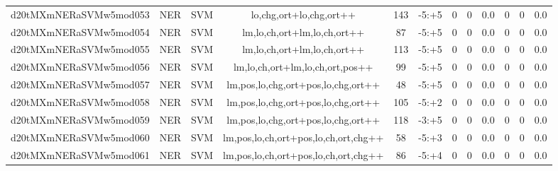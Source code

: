 \documentclass[a4paper]{article}
\begin{document}
\begin{landscape}
\begin{center}
\begin{tabular}{ |c|c|c|c|c|c|c|c|c|c|c|c|}
 
 	
 	\small{ d20tMXmNERaSVMw5mod053 } & \small{ NER} & \small{  SVM }  & lo,chg,ort+lo,chg,ort++  &  143 &  \small{  -5:+5 }  &  0 & 0 & 0.0  &  0 & 0 & 0.0 \\
 	

 
 	
 	\small{ d20tMXmNERaSVMw5mod054 } & \small{ NER} & \small{  SVM }  & lm,lo,ch,ort+lm,lo,ch,ort++  &  87 &  \small{  -5:+5 }  &  0 & 0 & 0.0  &  0 & 0 & 0.0 \\
 	

 
 	
 	\small{ d20tMXmNERaSVMw5mod055 } & \small{ NER} & \small{  SVM }  & lm,lo,ch,ort+lm,lo,ch,ort++  &  113 &  \small{  -5:+5 }  &  0 & 0 & 0.0  &  0 & 0 & 0.0 \\
 	

 
 	
 	\small{ d20tMXmNERaSVMw5mod056 } & \small{ NER} & \small{  SVM }  & lm,lo,ch,ort+lm,lo,ch,ort,pos++  &  99 &  \small{  -5:+5 }  &  0 & 0 & 0.0  &  0 & 0 & 0.0 \\
 	

 
 	
 	\small{ d20tMXmNERaSVMw5mod057 } & \small{ NER} & \small{  SVM }  & lm,pos,lo,chg,ort+pos,lo,chg,ort++  &  48 &  \small{  -5:+5 }  &  0 & 0 & 0.0  &  0 & 0 & 0.0 \\
 	

 
 	
 	\small{ d20tMXmNERaSVMw5mod058 } & \small{ NER} & \small{  SVM }  & lm,pos,lo,chg,ort+pos,lo,chg,ort++  &  105 &  \small{  -5:+2 }  &  0 & 0 & 0.0  &  0 & 0 & 0.0 \\
 	

 
 	
 	\small{ d20tMXmNERaSVMw5mod059 } & \small{ NER} & \small{  SVM }  & lm,pos,lo,chg,ort+pos,lo,chg,ort++  &  118 &  \small{  -3:+5 }  &  0 & 0 & 0.0  &  0 & 0 & 0.0 \\
 	

 
 	
 	\small{ d20tMXmNERaSVMw5mod060 } & \small{ NER} & \small{  SVM }  & lm,pos,lo,ch,ort+pos,lo,ch,ort,chg++  &  58 &  \small{  -5:+3 }  &  0 & 0 & 0.0  &  0 & 0 & 0.0 \\
 	

 
 	
 	\small{ d20tMXmNERaSVMw5mod061 } & \small{ NER} & \small{  SVM }  & lm,pos,lo,ch,ort+pos,lo,ch,ort,chg++  &  86 &  \small{  -5:+4 }  &  0 & 0 & 0.0  &  0 & 0 & 0.0 \\
 	


\end{tabular}
\end{center}
\end{landscape}
\end{document}
